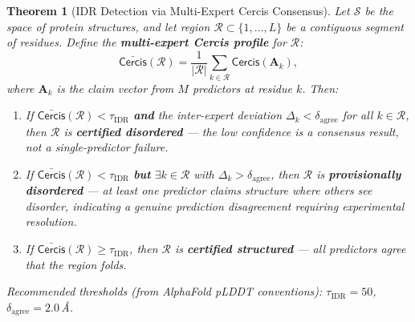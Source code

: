 \documentclass[12pt,a4paper]{article}
\newtheorem{theorem}{Theorem}[section]
\theoremstyle{remark}
\newcommand{\Sstruct}{\mathcal{S}}
\newcommand{\Cercis}{\textsf{Cercis}}
\begin{document}
\begin{theorem}[IDR Detection via Multi-Expert Cercis Consensus]
\label{thm:idr-cercis}
Let $\Sstruct$ be the space of protein structures, and let region $\mathcal{R} \subset \{1, \dots, L\}$ be a contiguous segment of residues.
Define the \textbf{multi-expert Cercis profile} for $\mathcal{R}$:
\begin{equation}
    \bar{\Cercis}(\mathcal{R}) = \frac{1}{|\mathcal{R}|}\sum_{k \in \mathcal{R}} \Cercis(\mathbf{A}_k),
\end{equation}
where $\mathbf{A}_k$ is the claim vector from $M$ predictors at residue $k$.
Then:
\begin{enumerate}[leftmargin=*,label=(\roman*)]
    \item If $\bar{\Cercis}(\mathcal{R}) < \tau_{\text{IDR}}$ \textbf{and} the inter-expert deviation $\Delta_k < \delta_{\text{agree}}$ for all $k \in \mathcal{R}$, then $\mathcal{R}$ is \textbf{certified disordered} — the low confidence is a consensus result, not a single-predictor failure.
    \item If $\bar{\Cercis}(\mathcal{R}) < \tau_{\text{IDR}}$ \textbf{but} $\exists k \in \mathcal{R}$ with $\Delta_k > \delta_{\text{agree}}$, then $\mathcal{R}$ is \textbf{provisionally disordered} — at least one predictor claims structure where others see disorder, indicating a genuine prediction disagreement requiring experimental resolution.
    \item If $\bar{\Cercis}(\mathcal{R}) \geq \tau_{\text{IDR}}$, then $\mathcal{R}$ is \textbf{certified structured} — all predictors agree that the region folds.
\end{enumerate}
Recommended thresholds (from AlphaFold pLDDT conventions): $\tau_{\text{IDR}} = 50$, $\delta_{\text{agree}} = 2.0$\,\AA{}.
\end{theorem}
\end{document}
